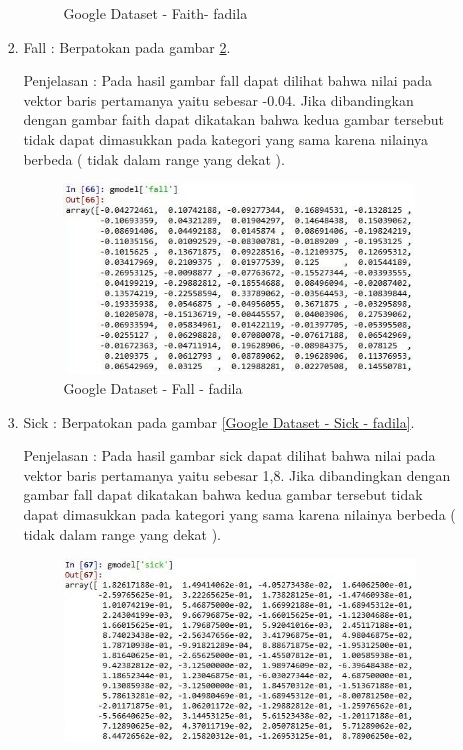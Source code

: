 \begin{enumerate}
\begin{enumerate}
\begin{enumerate}
\begin{figure}[!hbtp]
\caption{Google Dataset - Faith- fadila}
\label{Google Dataset - Faith- fadila}
\end{figure}
\par
\item Fall :  Berpatokan pada gambar \ref{Google Dataset - Fall - fadila}.
\par Penjelasan : Pada hasil gambar fall dapat dilihat bahwa nilai pada vektor baris pertamanya yaitu sebesar -0.04. Jika dibandingkan dengan gambar faith dapat dikatakan bahwa kedua gambar tersebut tidak dapat dimasukkan pada kategori yang sama karena nilainya berbeda ( tidak dalam range yang dekat ).
\par
\begin{figure}[!hbtp]
\centering
\includegraphics[scale=0.3]{figures/1-fall-fadila.jpg}
\caption{Google Dataset - Fall - fadila}
\label{Google Dataset - Fall - fadila}
\end{figure}
\par
\item Sick :  Berpatokan pada gambar \ref{Google Dataset - Sick - fadila}.
\par Penjelasan : Pada hasil gambar sick dapat dilihat bahwa nilai pada vektor baris pertamanya yaitu sebesar 1,8. Jika dibandingkan dengan gambar fall dapat dikatakan bahwa kedua gambar tersebut tidak dapat dimasukkan pada kategori yang sama karena nilainya berbeda ( tidak dalam range yang dekat ).
\par
\begin{figure}[!hbtp]
\centering
\includegraphics[scale=0.3]{figures/1-sick-fadila.jpg}

\end{figure}
\end{enumerate}
\end{enumerate}
\end{enumerate}
